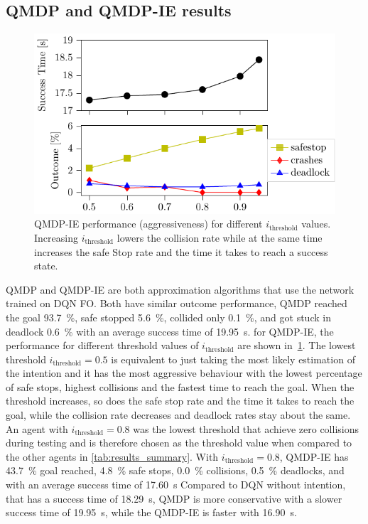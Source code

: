 \subsection{QMDP and QMDP-IE results}
\begin{figure}[!t]
    \centering
        \includegraphics[width=0.99\columnwidth]{figures/figures-intention-t.pdf}
        \caption{QMDP-IE performance (aggressiveness) for different $i_\text{threshold}$ values. Increasing $i_\text{threshold}$ lowers the collision rate while at the same time increases the safe Stop rate and the time it takes to reach a success state.}
    \label{fig:intent_threshold}
\end{figure}

QMDP and QMDP-IE are both approximation algorithms that use the network trained on DQN FO. 
Both have similar outcome performance, QMDP reached the goal \SI{93.7}{\percent}, safe stopped \SI{5.6}{\percent}, collided only \SI{0.1}{\percent}, and got stuck in deadlock \SI{0.6}{\percent} with an average success time of \SI{19.95}{\second}. for QMDP-IE, the performance for different threshold values of $i_\text{threshold}$ are shown in~\ref{fig:intent_threshold}. 
The lowest threshold $i_\text{threshold}=0.5$ is equivalent to just taking the most likely estimation of the intention and it has the most aggressive behaviour with the lowest percentage of safe stops, highest collisions and the fastest time to reach the goal. When the threshold increases, so does the safe stop rate and the time it takes to reach the goal, while the collision rate decreases and deadlock rates stay about the same. 
An agent with $i_\text{threshold}=0.8$ was the lowest threshold that achieve zero collisions during testing and is therefore chosen as the threshold value when compared to the other agents in \ref{tab:results_summary}. 
With $i_\text{threshold}=0.8$, QMDP-IE has \SI{43.7}{\percent} goal reached, \SI{4.8}{\percent} safe stops, \SI{0.0}{\percent} collisions, \SI{0.5}{\percent} deadlocks, and with an average success time of \SI{17.60}{\second}
Compared to DQN without intention, that has a success time of \SI{18.29}{\second}, QMDP is more conservative with a slower success time of \SI{19.95}{\second}, while the QMDP-IE is faster with \SI{16.90}{\second}. 


